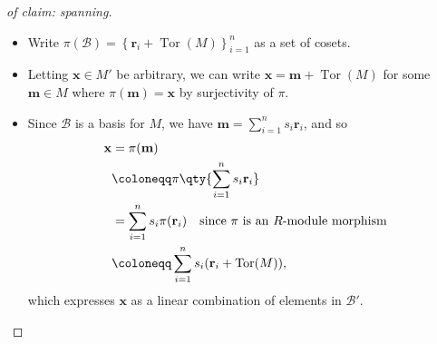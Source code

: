 \begin{proof}[of claim: spanning]

\envlist

\begin{itemize}
\item
  Write
  \(\pi(\mathcal B) = \left\{{\mathbf{r}_i + \operatorname{Tor}(M)}\right\}_{i=1}^n\)
  as a set of cosets.
\item
  Letting \(\mathbf{x} \in M'\) be arbitrary, we can write
  \(\mathbf{x} = \mathbf{m} + \operatorname{Tor}(M)\) for some
  \(\mathbf{m} \in M\) where \(\pi(\mathbf{m}) = \mathbf{x}\) by
  surjectivity of \(\pi\).
\item
  Since \(\mathcal B\) is a basis for \(M\), we have
  \(\mathbf{m} = \sum_{i=1}^n s_i \mathbf{r}_i\), and so
  \begin{align*}
  \mathbf{x}
  &= \pi(\mathbf{m}) \\
  &\coloneqq\pi\qty{ \sum_{i=1}^n s_i \mathbf{r}_i} \\
  &= \sum_{i=1}^n s_i \pi(\mathbf{r}_i) \quad\text{since $\pi$ is an $R{\hbox{-}}$module morphism}\\
  &\coloneqq\sum_{i=1}^n s_i \mathbf{(}\mathbf{r}_i + \operatorname{Tor}(M))
  ,\end{align*}
  which expresses \(\mathbf{x}\) as a linear combination of elements in
  \(\mathcal B'\).
\end{itemize}

\end{proof}

